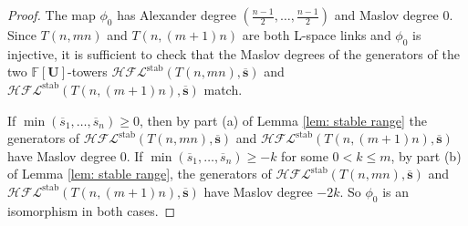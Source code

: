 \documentclass{amsart}
\newtheorem{lemma}[theorem]{Lemma}
\newcommand{\F}{\mathbb{F}}
\newcommand{\cHFL}{\mathcal{H\!F\! L}}
\newcommand{\ovl}{\overline}
\newcommand{\UU}{\mathbf{U}}
\newcommand{\cc}{\mathbf{c}}
\newcommand{\stab}{\mathrm{stab}}
\renewcommand{\ss}{\mathbf{s}}
\begin{document}
\begin{proof}
The map $\phi_0$ has Alexander degree $\left(\frac{n-1}{2},\ldots,\frac{n-1}{2}\right)$ and Maslov degree 0. Since $T(n,mn)$ and $T(n,(m+1)n)$ are both L-space links and $\phi_0$ is injective,  it is sufficient to check that the Maslov degrees of the generators of the two $\F[\UU]$-towers $\cHFL^{\stab}\left(T(n,mn),\ovl{\ss}\right)$ and $\cHFL^{\stab}\left(T(n,(m+1)n),\ovl{\ss}\right)$ match.


If $\min(\ovl{s}_1,\ldots,\ovl{s}_n)\ge 0$, then by part (a) of Lemma \ref{lem: stable range} the generators of $\cHFL^{\stab}\left(T(n,mn),\ovl{\ss}\right)$ and $\cHFL^{\stab}\left(T(n,(m+1)n),\ovl{\ss}\right)$ have Maslov degree $0$. If $\min(\ovl{s}_1,\ldots,\ovl{s}_n)\ge -k$ for some $0<k\le m$, by part (b) of Lemma  \ref{lem: stable range}, the generators of $\cHFL^{\stab}\left(T(n,mn),\ovl{\ss}\right)$ and $\cHFL^{\stab}\left(T(n,(m+1)n),\ovl{\ss}\right)$ have Maslov degree $-2k$. So $\phi_0$ is an isomorphism in both cases.




\end{proof}



\end{document}
